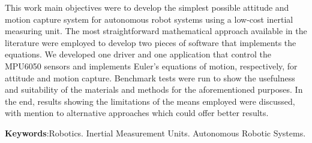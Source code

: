 \begin{resumo}[ABSTRACT]
\begin{SingleSpacing}


    This work main objectives were to develop the simplest possible attitude and motion capture system for autonomous robot systems using a low-cost inertial measuring unit.
    The most straightforward mathematical approach available in the literature were employed to develop two pieces of software that implements the equations.
    We developed one driver and one application that control the MPU6050 sensors and implements Euler's equations of motion, respectively, for attitude and motion capture.
    Benchmark tests were run to show the usefulness and suitability of the materials and methods for the aforementioned purposes.
    In the end, results showing the limitations of the means employed were discussed, with mention to alternative approaches which could offer better results.

\textbf{Keywords}:Robotics. Inertial Measurement Units. Autonomous Robotic Systems.
\end{SingleSpacing}
\end{resumo}
